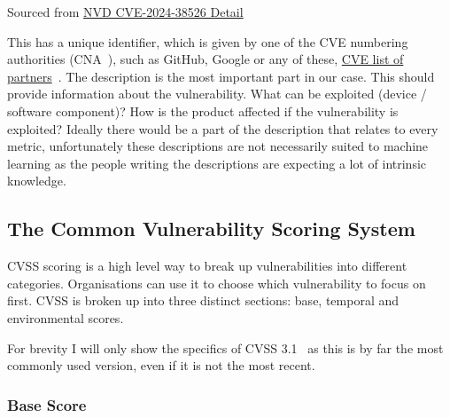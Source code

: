 \documentclass[12pt]{article}
\begin{document}
{\footnotesize Sourced from \href{https://nvd.nist.gov/vuln/detail/CVE-2024-38526}{NVD CVE-2024-38526
	Detail} \cite{polyfill}} \\
\bigskip

This has a unique identifier, which is given by one of the CVE numbering authorities (CNA~\cite{CNA}), such as
GitHub, Google or any of these, \href{https://www.cve.org/PartnerInformation/ListofPartners}{CVE list of
	partners}~\cite{partners}.
The description is the most important part in our case. This should provide information about the
vulnerability. What can be exploited (device / software component)? How is the product affected if
the vulnerability is exploited? Ideally there would be a part of the description that relates to every metric,
unfortunately these descriptions are not necessarily suited to machine learning as the people
writing the descriptions are expecting a lot of intrinsic knowledge.

\subsection*{The Common Vulnerability Scoring System}

CVSS scoring is a high level way to break up vulnerabilities into different categories.
Organisations can use it to choose which vulnerability to focus on first. CVSS is broken up into
three distinct sections: base, temporal and environmental scores.

For brevity I will only show the specifics of CVSS 3.1~\cite{CVSS_31} as this is by far the most commonly used
version, even if it is not the most recent.

\subsubsection*{Base Score}
\end{document}
